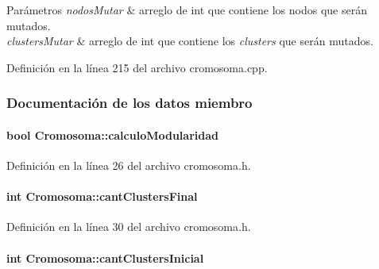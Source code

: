 \begin{DoxyParams}{Parámetros}
{\em nodos\-Mutar} & arreglo de int que contiene los nodos que ser\'{a}n mutados. \\
\hline
{\em clusters\-Mutar} & arreglo de int que contiene los {\itshape clusters} que ser\'{a}n mutados. \\
\hline
\end{DoxyParams}


Definición en la línea 215 del archivo cromosoma.\-cpp.



\subsubsection{Documentación de los datos miembro}
\hypertarget{class_cromosoma_aa0725a35f0aff05db24fb9a34bc203c6}{
\paragraph[{calculo\-Modularidad}]{\setlength{\rightskip}{0pt plus 5cm}bool Cromosoma\-::calculo\-Modularidad\hspace{0.3cm}{\ttfamily [private]}}}\label{class_cromosoma_aa0725a35f0aff05db24fb9a34bc203c6}


Definición en la línea 26 del archivo cromosoma.\-h.

\hypertarget{class_cromosoma_a52614c5344094ee5c517638e018a3706}{
\paragraph[{cant\-Clusters\-Final}]{\setlength{\rightskip}{0pt plus 5cm}int Cromosoma\-::cant\-Clusters\-Final\hspace{0.3cm}{\ttfamily [private]}}}\label{class_cromosoma_a52614c5344094ee5c517638e018a3706}


Definición en la línea 30 del archivo cromosoma.\-h.

\hypertarget{class_cromosoma_a3b705a43d31136065740f0e01ee6af0b}{
\paragraph[{cant\-Clusters\-Inicial}]{\setlength{\rightskip}{0pt plus 5cm}int Cromosoma\-::cant\-Clusters\-Inicial\hspace{0.3cm}{\ttfamily [private]}}}\label{class_cromosoma_a3b705a43d31136065740f0e01ee6af0b}


